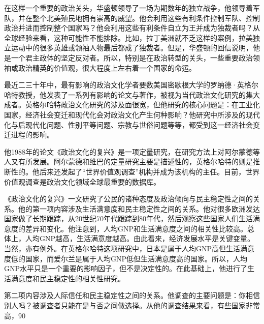 在这样一个重要的政治关头，华盛顿领导了一场为期数年的独立战争，他领导着军队，并在整个北美殖民地拥有崇高的威望。他会利用这些有利条件控制军队、控制政治并进而控制整个国家吗？他会利用这些有利条件自立为王并成为独裁者吗？从全球经验来看，这种可能性不能排除。比如，拉丁美洲就不乏这样的案例，拉美独立运动中的很多英雄或领袖人物最后都成了独裁者。但是，华盛顿的回信说明，他是一个君主政体的坚定反对者。所以，特别是在政治转型的关头，一些重要政治领袖或政治精英的价值观，很大程度上左右着一个国家的命运。


最近二三十年中，最有影响的政治文化学者要数美国密歇根大学的罗纳德·英格尔哈特教授，他发表了一系列有影响的论文与著作，被视为当代政治文化研究的集大成者。英格尔哈特政治文化研究的涉及面很宽，但他研究的核心问题是：在工业化国家，经济社会变迁和现代化会对政治文化产生何种影响？他研究中所涉及的现代化与后现代化问题、性别平等问题、宗教与世俗问题等等，都受到这一经济社会变迁进程的影响。

他1988年的论文《政治文化的复兴》是一项定量研究，在研究方法上对阿尔蒙德等人又有所发展。阿尔蒙德和维巴的定量研究主要是描述性的，英格尔哈特的则是推断性的。他后来还发起了“世界价值观调查”机构并成为该机构的主任。目前，世界价值观调查是政治文化领域全球最重要的数据库。

《政治文化的复兴》一文研究了公民的诸种态度及政治倾向与民主稳定性之间的关系。他的第一项内容涉及生活满意度和民主稳定性之间的关系。他对很多欧洲发达国家做了长期跟踪，从20世纪70年代跟踪到80年代，然后观察这些国家人们生活满意度的差异和变化。他注意到，人均GNP和生活满意度之间的相关性比较高。总体上，人均GNP越高，生活满意度越高。由此看来，经济发展水平是关键变量。当然，亦有例外。在英格尔哈特这项研究中，日本是属于人均GNP高但生活满意度低的国家，而爱尔兰是属于人均GNP低但生活满意度高的国家。所以，人均GNP水平只是一个重要的影响因子，但不是决定性的。在此基础上，他进行了生活满意度和民主稳定性的相关性研究。

第二项内容涉及人际信任和民主稳定性之间的关系。他调查的主要问题是：你相信别人吗？被调查者只能在是与否之间做选择。从他的调查结果来看，有些国家非常高，90%

